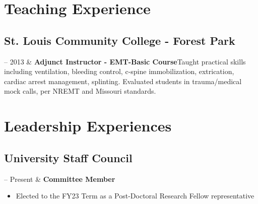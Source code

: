 \documentclass[10pt, letterpaper]{article}
\newcommand{\Duration}[2]{\fontsize{9pt}{0}\selectfont #1 -- #2}
\newcommand{\Ongoing}{Present} %
\newcommand{\Twoline}[2]{\textbf{#1}\newline  #2}
\begin{document}
%
\section{Teaching Experience}
\subsection{St. Louis Community College - Forest Park}


\begin{EntriesTable}
  \Duration{2010}{2013} &
  \Twoline{Adjunct Instructor - EMT-Basic Course}
  {Taught practical skills including ventilation, bleeding control, c-spine immobilization, extrication, cardiac arrest management, splinting. \newline
  Evaluated students in trauma/medical mock calls, per NREMT and Missouri standards.}
\end{EntriesTable}



\section{Leadership Experiences}
\subsection{University Staff Council}
\begin{EntriesTable}
  \Duration{2023}{\Ongoing} &
  \Twoline{Committee Member}
  {
  \vspace{-0.4cm}
  \begin{itemize}
  
  \item Elected to the FY23 Term as a Post-Doctoral Research Fellow representative
  
  \end{itemize}
  }
  \end{EntriesTable}
\end{document}
